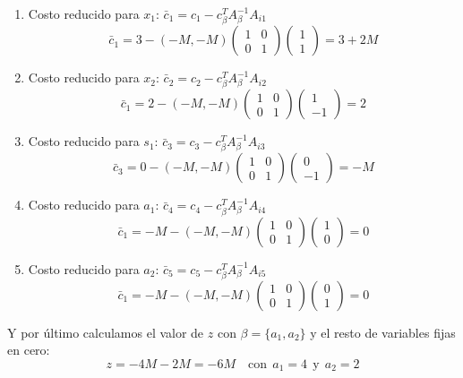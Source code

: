 \begin{enumerate}
  \item Costo reducido para \(x_1\): \(\bar{c}_1 = c_1 - c_\beta ^T A_\beta^{-1} A_{i1}\)
  \[
    \bar{c}_1 = 3 - (-M,-M) \begin{pmatrix}
      1 & 0 \\ 0 & 1
    \end{pmatrix} \begin{pmatrix}
      1 \\ 1
    \end{pmatrix} = 3 + 2M
  \]
  \item Costo reducido para \(x_2\): \(\bar{c}_2 = c_2 - c_\beta ^T A_\beta^{-1} A_{i2}\)
  \[
    \bar{c}_1 = 2 - (-M,-M) \begin{pmatrix}
      1 & 0 \\ 0 & 1
    \end{pmatrix} \begin{pmatrix}
      1 \\ -1
    \end{pmatrix} = 2
  \]
  \item Costo reducido para \(s_1\): \(\bar{c}_3 = c_3 - c_\beta ^T A_\beta^{-1} A_{i3}\)
  \[
    \bar{c}_3 = 0 - (-M,-M) \begin{pmatrix}
      1 & 0 \\ 0 & 1
    \end{pmatrix} \begin{pmatrix}
      0 \\ -1
    \end{pmatrix} = -M
  \]
  \item Costo reducido para \(a_1\): \(\bar{c}_4 = c_4 - c_\beta ^T A_\beta^{-1} A_{i4}\)
  \[
    \bar{c}_1 = -M - (-M,-M) \begin{pmatrix}
      1 & 0 \\ 0 & 1
    \end{pmatrix} \begin{pmatrix}
      1 \\ 0
    \end{pmatrix} = 0
  \]
  \item Costo reducido para \(a_2\): \(\bar{c}_5 = c_5 - c_\beta ^T A_\beta^{-1} A_{i5}\)
  \[
    \bar{c}_1 = -M - (-M,-M) \begin{pmatrix}
      1 & 0 \\ 0 & 1
    \end{pmatrix} \begin{pmatrix}
      0 \\ 1
    \end{pmatrix} = 0
  \]
\end{enumerate}
Y por último calculamos el valor de \(z\) con \(\beta = \{a_1,a_2\}\) y el resto de variables fijas en cero:
\[
  z = -4M - 2M = -6M \quad \text{con} ~~ a_1 = 4 ~~\text{y}~~ a_2 = 2
\]

